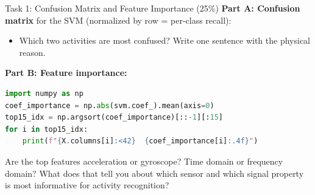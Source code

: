\documentclass[aspectratio=169,11pt]{beamer}
\begin{document}
\begin{frame}[fragile]{Task 1: Confusion Matrix and Feature Importance (25\%)}
    \textbf{Part A: Confusion matrix} for the SVM (normalized by row = per-class recall):
    \begin{itemize}
        \item Which two activities are most confused? Write one sentence with the physical reason.
    \end{itemize}

    \vspace{0.2cm}
    \textbf{Part B: Feature importance:}
\begin{lstlisting}[language=Python]
import numpy as np
coef_importance = np.abs(svm.coef_).mean(axis=0)
top15_idx = np.argsort(coef_importance)[::-1][:15]
for i in top15_idx:
    print(f"{X.columns[i]:<42}  {coef_importance[i]:.4f}")
\end{lstlisting}

    Are the top features acceleration or gyroscope? Time domain or frequency domain? What does that tell you about which sensor and which signal property is most informative for activity recognition?

    \vspace{0.1cm}
\end{frame}
\end{document}

